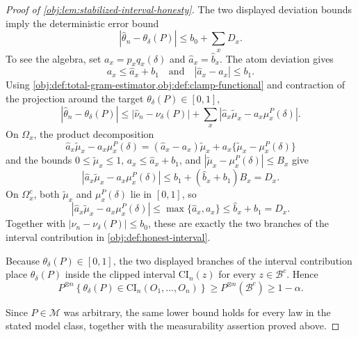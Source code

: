 \begin{proof}[Proof of \cref{obj:lem:stabilized-interval-honesty}]
The two displayed deviation bounds imply the deterministic error bound
\[
        \left|
        \widehat\theta_n-\theta_\delta(P)
        \right|
        \le
        b_0+\sum_xD_x .
\]
To see the algebra, set \(a_x=p_xq_x(\delta)\) and \(\widehat a_x=\widehat b_x\).  The atom deviation gives
\[
        a_x\le \widehat a_x+b_1
        \quad\text{and}\quad
        |\widehat a_x-a_x|\le b_1 .
\]
Using \cref{obj:def:total-gram-estimator,obj:def:clamp-functional} and contraction of the projection around the target \(\theta_\delta(P)\in[0,1]\),
\[
\left|
\widehat\theta_n-\theta_\delta(P)
\right|
\le
|\widehat\nu_n-\nu_\delta(P)|
+
\sum_x
\left|
\widehat a_x\widetilde\mu_x-a_x\mu_x^P(\delta)
\right|.
\]
On \(\Omega_x\), the product decomposition
\[
\widehat a_x\widetilde\mu_x-a_x\mu_x^P(\delta)
=
(\widehat a_x-a_x)\widetilde\mu_x
+
a_x\{\widetilde\mu_x-\mu_x^P(\delta)\}
\]
and the bounds \(0\le \widetilde\mu_x\le1\), \(a_x\le\widehat a_x+b_1\), and
\(|\widetilde\mu_x-\mu_x^P(\delta)|\le B_x\) give
\[
\left|
\widehat a_x\widetilde\mu_x-a_x\mu_x^P(\delta)
\right|
\le
b_1+(\widehat b_x+b_1)B_x
=D_x .
\]
On \(\Omega_x^c\), both \(\widetilde\mu_x\) and \(\mu_x^P(\delta)\) lie in \([0,1]\), so
\[
\left|
\widehat a_x\widetilde\mu_x-a_x\mu_x^P(\delta)
\right|
\le
\max\{\widehat a_x,a_x\}
\le
\widehat b_x+b_1
=D_x .
\]
Together with \(|\widehat\nu_n-\nu_\delta(P)|\le b_0\), these are exactly the two branches of the interval contribution in \cref{obj:def:honest-interval}. %

Because \(\theta_\delta(P)\in[0,1]\), the two displayed branches of the interval contribution place \(\theta_\delta(P)\) inside the clipped interval \(\mathrm{CI}_n(z)\) for every \(z\in\mathcal B^c\).  Hence
\[
 P^{\otimes n}\!\left\{
 \theta_\delta(P)\in \mathrm{CI}_n(O_1,\ldots,O_n)
 \right\}
 \ge
 P^{\otimes n}(\mathcal B^c)
 \ge
 1-\alpha .
\]

Since \(P\in\mathcal M\) was arbitrary, the same lower bound holds for every law in the stated model class, together with the measurability assertion proved above. %
\end{proof}

